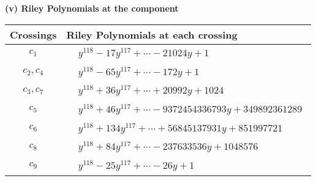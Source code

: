 \documentclass[1p]{elsarticle_modified}
\theoremstyle{definition}
\begin{document}
\newpage\renewcommand{\arraystretch}{1}
\flushleft \textbf{(v) Riley Polynomials at the component}\newline \\
\begin{tabular}{m{50pt}|m{274pt}}
Crossings & \hspace{64pt}Riley Polynomials at each crossing \\
\hline $$\begin{aligned}c_{1}\end{aligned}$$&$\begin{aligned}
&y^{118}-17 y^{117}+\cdots-21024 y+1
\end{aligned}$\\
\hline $$\begin{aligned}c_{2},c_{4}\end{aligned}$$&$\begin{aligned}
&y^{118}-65 y^{117}+\cdots-172 y+1
\end{aligned}$\\
\hline $$\begin{aligned}c_{3},c_{7}\end{aligned}$$&$\begin{aligned}
&y^{118}+36 y^{117}+\cdots+20992 y+1024
\end{aligned}$\\
\hline $$\begin{aligned}c_{5}\end{aligned}$$&$\begin{aligned}
&y^{118}+46 y^{117}+\cdots-9372454336793 y+349892361289
\end{aligned}$\\
\hline $$\begin{aligned}c_{6}\end{aligned}$$&$\begin{aligned}
&y^{118}+134 y^{117}+\cdots+56845137931 y+851997721
\end{aligned}$\\
\hline $$\begin{aligned}c_{8}\end{aligned}$$&$\begin{aligned}
&y^{118}+84 y^{117}+\cdots-237633536 y+1048576
\end{aligned}$\\
\hline $$\begin{aligned}c_{9}\end{aligned}$$&$\begin{aligned}
&y^{118}-25 y^{117}+\cdots-26 y+1
\end{aligned}$\\

\end{tabular}
\end{document}

